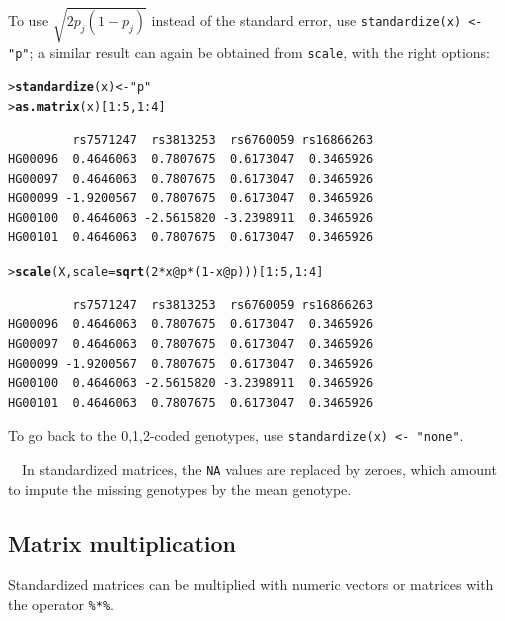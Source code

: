 \documentclass{article}\usepackage[]{graphicx}\usepackage[]{color}
\makeatletter
\newcommand{\hlnum}[1]{\textcolor[rgb]{0.686,0.059,0.569}{#1}}%
\newcommand{\hlstr}[1]{\textcolor[rgb]{0.192,0.494,0.8}{#1}}%
\newcommand{\hlopt}[1]{\textcolor[rgb]{0,0,0}{#1}}%
\newcommand{\hlstd}[1]{\textcolor[rgb]{0.345,0.345,0.345}{#1}}%
\newcommand{\hlkwb}[1]{\textcolor[rgb]{0.69,0.353,0.396}{#1}}%
\newcommand{\hlkwc}[1]{\textcolor[rgb]{0.333,0.667,0.333}{#1}}%
\newcommand{\hlkwd}[1]{\textcolor[rgb]{0.737,0.353,0.396}{\textbf{#1}}}%
\newenvironment{kframe}{%
 \def\at@end@of@kframe{}%
 \ifinner\ifhmode%
  \def\at@end@of@kframe{\end{minipage}}%
  \begin{minipage}{\columnwidth}%
 \fi\fi%
 \def\FrameCommand##1{\hskip\@totalleftmargin \hskip-\fboxsep
 \colorbox{shadecolor}{##1}\hskip-\fboxsep
     \hskip-\linewidth \hskip-\@totalleftmargin \hskip\columnwidth}%
 \MakeFramed {\advance\hsize-\width
   \@totalleftmargin\z@ \linewidth\hsize
   \@setminipage}}%
 {\par\unskip\endMakeFramed%
 \at@end@of@kframe}
\newenvironment{knitrout}{}{} %
\makeatother
\begin{document}
  To use $\sqrt{2p_j(1-p_j)}$ instead of the standard error, use \verb!standardize(x) <- "p"!; a similar
  result can again be obtained from \verb!scale!, with the right options:
\begin{knitrout}
\color{fgcolor}\begin{kframe}
\begin{alltt}
\hlstd{> }\hlkwd{standardize}\hlstd{(x)} \hlkwb{<-} \hlstr{"p"}
\hlstd{> }\hlkwd{as.matrix}\hlstd{(x)[}\hlnum{1}\hlopt{:}\hlnum{5}\hlstd{,} \hlnum{1}\hlopt{:}\hlnum{4}\hlstd{]}
\end{alltt}
\begin{verbatim}
         rs7571247  rs3813253  rs6760059 rs16866263
HG00096  0.4646063  0.7807675  0.6173047  0.3465926
HG00097  0.4646063  0.7807675  0.6173047  0.3465926
HG00099 -1.9200567  0.7807675  0.6173047  0.3465926
HG00100  0.4646063 -2.5615820 -3.2398911  0.3465926
HG00101  0.4646063  0.7807675  0.6173047  0.3465926
\end{verbatim}
\begin{alltt}
\hlstd{> }\hlkwd{scale}\hlstd{(X,} \hlkwc{scale} \hlstd{=} \hlkwd{sqrt}\hlstd{(}\hlnum{2}\hlopt{*}\hlstd{x}\hlopt{@}\hlkwc{p}\hlopt{*}\hlstd{(}\hlnum{1}\hlopt{-}\hlstd{x}\hlopt{@}\hlkwc{p}\hlstd{)))[}\hlnum{1}\hlopt{:}\hlnum{5}\hlstd{,}\hlnum{1}\hlopt{:}\hlnum{4}\hlstd{]}
\end{alltt}
\begin{verbatim}
         rs7571247  rs3813253  rs6760059 rs16866263
HG00096  0.4646063  0.7807675  0.6173047  0.3465926
HG00097  0.4646063  0.7807675  0.6173047  0.3465926
HG00099 -1.9200567  0.7807675  0.6173047  0.3465926
HG00100  0.4646063 -2.5615820 -3.2398911  0.3465926
HG00101  0.4646063  0.7807675  0.6173047  0.3465926
\end{verbatim}
\end{kframe}
\end{knitrout}

  To go back to the 0,1,2-coded genotypes, use \verb!standardize(x) <- "none"!.

  \ \ In standardized matrices, the \verb!NA! values are replaced by zeroes,
  which amount to impute the missing genotypes by the mean genotype.

\subsection{Matrix multiplication}

  Standardized matrices can be multiplied with numeric vectors or matrices with the operator \verb!%*%!.
\end{document}
